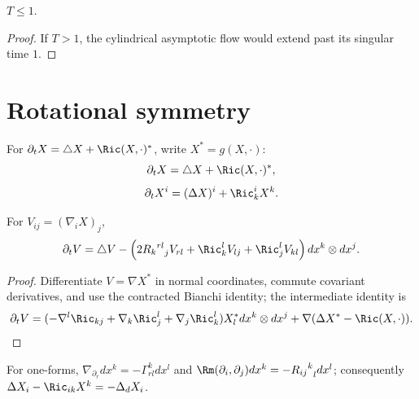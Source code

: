 \begin{corollary}
\label{cor:standard-flow-time-bound-one}
\label{1}
$T\le1$.
\end{corollary}
\begin{proof}
\sketch If $T>1$, the cylindrical asymptotic flow would extend past its
singular time $1$.
\end{proof}

\section{Rotational symmetry}

For $\partial_tX=\triangle X+\Ric(X,\cdot)^*$, write $X^*=g(X,\cdot)$:
\begin{equation}\label{eq1}\partial_tX=\triangle X+\Ric(X,\cdot)^*,\end{equation}
\begin{equation}\label{eq.3}\partial_tX^i=(\Delta X)^i+\Ric^i_kX^k.\end{equation}

\begin{lemma}[Evolution of $V=\nabla X^*$]
\label{lem:v-tensor-evolution}
\label{12.9}
For $V_{ij}=(\nabla_iX)_j$,
\begin{equation}\label{eq.4}
 \partial_tV=\triangle V-\left(2{{R_k}^{rl}}_jV_{rl}+\Ric_k^lV_{lj}
 +\Ric_j^lV_{kl}\right)dx^k\otimes dx^j.
\end{equation}
\end{lemma}
\begin{proof}
\sketch Differentiate $V=\nabla X^*$ in normal coordinates, commute
covariant derivatives, and use the contracted Bianchi identity; the
intermediate identity is
\begin{equation}\label{eqn1}
 \partial_tV=(-\nabla^l\Ric_{kj}+\nabla_k\Ric_j^l+\nabla_j\Ric_k^l)X_l^*dx^k\otimes dx^j
 +\nabla(\Delta X^*-\Ric(X,\cdot)).
\end{equation}
\end{proof}

\begin{remark}
\label{rem:covariant-derivative-one-forms}
For one-forms, $\nabla_{\partial_r}dx^k=-\Gamma^k_{rl}dx^l$ and
$\Rm(\partial_i,\partial_j)dx^k=-{{R_{ij}}^k}_l dx^l$; consequently
$\Delta X_i-\Ric_{ik}X^k=-\Delta_dX_i$.
\end{remark}

